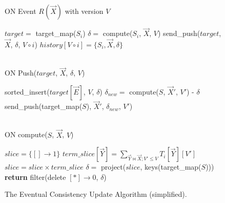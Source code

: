 \documentclass{vldb}
\begin{document}
\begin{figure}
ON Event $R(\vec X)$ with version $V$
\begin{algorithmic}[1]
	\STATE $target =$ target\_map($S_i$)
	\STATE $\delta =$ compute($S_i$, $\vec X$, $V$)
	\IF{$\delta \neq \emptyset$}
    \STATE send\_push($target$, $\vec X$, $\delta$, $V \circ i$)
  \ENDIF
	\STATE $history[V\circ i] = \{S_i, \vec X, \delta\}$ 
\ENDFOR
\end{algorithmic}
\ \\
ON Push($target$, $\vec X$, $\delta$, $V$)
\begin{algorithmic}[1]
  \STATE sorted\_insert($target[\vec E]$, $V$, $\delta$)
\ENDFOR
{}
		\STATE $\delta_{new} =$ compute($S$, $\vec X'$, $V'$) - $\delta$
      \STATE send\_push(target\_map($S$), $\vec X'$, $\delta_{new}$, $V'$)
    \ENDIF
	\ENDIF
\ENDFOR
\end{algorithmic}
\ \\
ON compute($S$, $\vec X$, $V$)
\begin{algorithmic}[1]
\STATE $slice = \{[] \rightarrow 1\}$
\STATE {}
  \STATE {}
  \STATE $term\_slice[\vec Y] = \sum_{\vec Y \bowtie \vec X; V' \leq V} T_i[\vec Y][V']$
  \STATE $slice = slice \times term\_slice$
\ENDFOR
\STATE $\delta =$ project($slice$, keys(target\_map($S$)))
\STATE \textbf{return} filter(delete $[*]\rightarrow 0$, $\delta$)
\end{algorithmic}
\caption{The Eventual Consistency Update Algorithm (simplified).}
\label{fig:eventualconsistency}
\end{figure}
\end{document}
